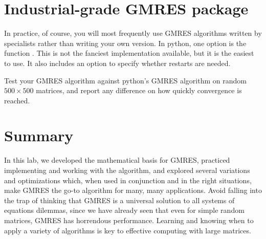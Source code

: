 \section*{Industrial-grade GMRES package}
In practice, of course, you will most frequently use GMRES algorithms written by specialists rather than writing your own version.
In python, one option is the function .
This is not the fanciest implementation available, but it is the easiest to use.
It also includes an option to specify whether restarts are needed.

\begin{problem}
\label{prob:GMRES4}
Test your GMRES algorithm against python's GMRES algorithm on random $500\times 500$ matrices, and report any difference on how quickly convergence is reached.
\end{problem}

\section*{Summary}
In this lab, we developed the mathematical basis for GMRES, practiced implementing and working with the algorithm, and explored several variations and optimizations which, when used in conjunction and in the right situations, make GMRES the go-to algorithm for many, many applications.
Avoid falling into the trap of thinking that GMRES is a universal solution to all systems of equations dilemmas, since we have already seen that even for simple random matrices, GMRES has horrendous performance.
Learning and knowing when to apply a variety of algorithms is key to effective computing with large matrices.
